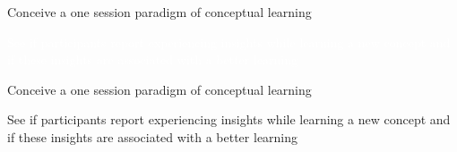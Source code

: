 \documentclass[11pt]{beamer}
\begin{document}
                
                \begin{frame}



                  
                  Conceive a one session paradigm of conceptual learning

                 \textcolor{white}{ See if participants report experiencing insights while learning a new concept and if these insights are associated with a better learning}

 
                 


                \end{frame}


                 \begin{frame}



                  
                  Conceive a one session paradigm of conceptual learning

                  See if participants report experiencing insights while learning a new concept and if these insights are associated with a better learning


                 


                 \end{frame}

               
\end{document}
